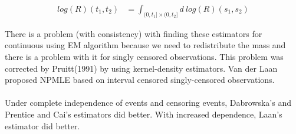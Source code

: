 \documentclass[]{article}
\begin{document}
	$$
	\begin{aligned}
		log(R)(t_1, t_2) &= \int_{(0,t_1]\times(0,t_2]} d~log(R)(s_1,s_2)
 	\end{aligned}
	$$

There is a problem (with consistency) with finding these estimators for continuous using EM algorithm because we need to redistribute the mass and there is a problem with it for singly censored observations. This problem was corrected by Pruitt(1991) by using kernel-density estimators. Van der Laan proposed NPMLE based on interval censored singly-censored observations.\\
\\
Under complete independence of events and censoring events, Dabrowska's and Prentice and Cai's estimators did better. With increased dependence, Laan's estimator did better.
	
\printbibliography
\end{document}
